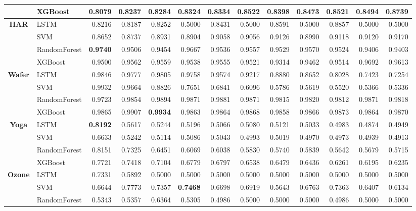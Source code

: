 \begin{table}[h]
\begin{adjustbox}{max width=15cm}
\begin{tabular}{|c|l|r|r|r|r|r|r|r|r|r|r|r|}
		& XGBoost &  0.8079 &  0.8237 &  0.8284 &  0.8324 &  0.8334 &  0.8522 &  0.8398 &  0.8473 &  0.8521 &  0.8494 &  0.8739 \\
		\hline
		\textbf{HAR} & LSTM &  0.8216 &  0.8187 &  0.8252 &  0.5000 &  0.8431 &  0.5000 &  0.8591 &  0.5000 &  0.8857 &  0.5000 &  0.5000 \\
		& SVM &  0.8652 &  0.8737 &  0.8931 &  0.8904 &  0.9058 &  0.9056 &  0.9126 &  0.8990 &  0.9118 &  0.9120 &  0.9170 \\
		& RandomForest &  \textbf{0.9740} &  0.9506 &  0.9454 &  0.9667 &  0.9536 &  0.9557 &  0.9529 &  0.9570 &  0.9524 &  0.9406 &  0.9403 \\
		& XGBoost &  0.9500 &  0.9562 &  0.9559 &  0.9538 &  0.9555 &  0.9521 &  0.9314 &  0.9462 &  0.9514 &  0.9692 &  0.9613 \\
		\hline
		\textbf{Wafer} & LSTM &  0.9846 &  0.9777 &  0.9805 &  0.9758 &  0.9574 &  0.9217 &  0.8880 &  0.8652 &  0.8028 &  0.7423 &  0.7254 \\
		& SVM &  0.9932 &  0.9664 &  0.8826 &  0.7651 &  0.6841 &  0.6096 &  0.5786 &  0.5619 &  0.5520 &  0.5366 &  0.5336 \\
		& RandomForest &  0.9723 &  0.9854 &  0.9894 &  0.9871 &  0.9881 &  0.9871 &  0.9815 &  0.9820 &  0.9812 &  0.9871 &  0.9818 \\
		& XGBoost &  0.9865 &  0.9907 &  \textbf{0.9934} &  0.9863 &  0.9864 &  0.9868 &  0.9858 &  0.9866 &  0.9873 &  0.9864 &  0.9870 \\
		\hline
		\textbf{Yoga} & LSTM &  \textbf{0.8192} &  0.5617 &  0.5244 &  0.5196 &  0.5066 &  0.5080 &  0.5121 &  0.5033 &  0.4983 &  0.4874 &  0.4949 \\
		& SVM &  0.6633 &  0.5242 &  0.5114 &  0.5086 &  0.5043 &  0.4993 &  0.5019 &  0.4970 &  0.4973 &  0.4939 &  0.4913 \\
		& RandomForest &  0.8151 &  0.7325 &  0.6451 &  0.6069 &  0.6038 &  0.5830 &  0.5740 &  0.5839 &  0.5642 &  0.5679 &  0.5715 \\
		& XGBoost &  0.7721 &  0.7418 &  0.7104 &  0.6779 &  0.6797 &  0.6538 &  0.6479 &  0.6436 &  0.6261 &  0.6195 &  0.6235 \\
		\hline
		\textbf{Ozone} & LSTM &  0.7331 &  0.5892 &  0.5000 &  0.5000 &  0.5000 &  0.5000 &  0.5000 &  0.5000 &  0.5000 &  0.5000 &  0.5000 \\
		& SVM &  0.6644 &  0.7773 &  0.7357 &  \textbf{0.7468} &  0.6698 &  0.6919 &  0.5643 &  0.6763 &  0.7363 &  0.6407 &  0.6134 \\
		& RandomForest &  0.5343 &  0.5357 &  0.6364 &  0.5305 &  0.4986 &  0.5000 &  0.5000 &  0.5000 &  0.4986 &  0.5000 &  0.5000 \\

\end{tabular}
\end{adjustbox}
\end{table}
